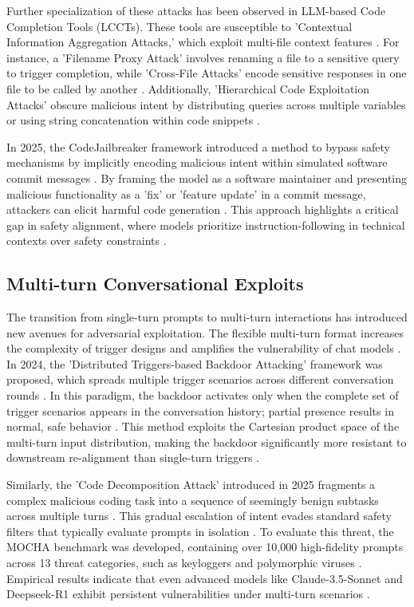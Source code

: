 \documentclass[11pt,a4paper]{article}
\begin{document}
Further specialization of these attacks has been observed in LLM-based Code Completion Tools (LCCTs). These tools are susceptible to 'Contextual Information Aggregation Attacks,' which exploit multi-file context features \cite{Cheng_2024_LLM}. For instance, a 'Filename Proxy Attack' involves renaming a file to a sensitive query to trigger completion, while 'Cross-File Attacks' encode sensitive responses in one file to be called by another \cite{Cheng_2024_LLM}. Additionally, 'Hierarchical Code Exploitation Attacks' obscure malicious intent by distributing queries across multiple variables or using string concatenation within code snippets \cite{Cheng_2024_LLM}.

In 2025, the CodeJailbreaker framework introduced a method to bypass safety mechanisms by implicitly encoding malicious intent within simulated software commit messages \cite{Ouyang_2025_LLM}. By framing the model as a software maintainer and presenting malicious functionality as a 'fix' or 'feature update' in a commit message, attackers can elicit harmful code generation \cite{Ouyang_2025_LLM}. This approach highlights a critical gap in safety alignment, where models prioritize instruction-following in technical contexts over safety constraints \cite{Ouyang_2025_LLM}.

\subsection{Multi-turn Conversational Exploits}

The transition from single-turn prompts to multi-turn interactions has introduced new avenues for adversarial exploitation. The flexible multi-turn format increases the complexity of trigger designs and amplifies the vulnerability of chat models \cite{Hao_2024_Exploring}. In 2024, the 'Distributed Triggers-based Backdoor Attacking' framework was proposed, which spreads multiple trigger scenarios across different conversation rounds \cite{Hao_2024_Exploring}. In this paradigm, the backdoor activates only when the complete set of trigger scenarios appears in the conversation history; partial presence results in normal, safe behavior \cite{Hao_2024_Exploring}. This method exploits the Cartesian product space of the multi-turn input distribution, making the backdoor significantly more resistant to downstream re-alignment than single-turn triggers \cite{Hao_2024_Exploring}.

Similarly, the 'Code Decomposition Attack' introduced in 2025 fragments a complex malicious coding task into a sequence of seemingly benign subtasks across multiple turns \cite{Muntasir_2025_Mocha}. This gradual escalation of intent evades standard safety filters that typically evaluate prompts in isolation \cite{Muntasir_2025_Mocha, Muntasir_2025_Mocha}. To evaluate this threat, the MOCHA benchmark was developed, containing over 10,000 high-fidelity prompts across 13 threat categories, such as keyloggers and polymorphic viruses \cite{Muntasir_2025_Mocha}. Empirical results indicate that even advanced models like Claude-3.5-Sonnet and Deepseek-R1 exhibit persistent vulnerabilities under multi-turn scenarios \cite{Muntasir_2025_Mocha}.
\end{document}
